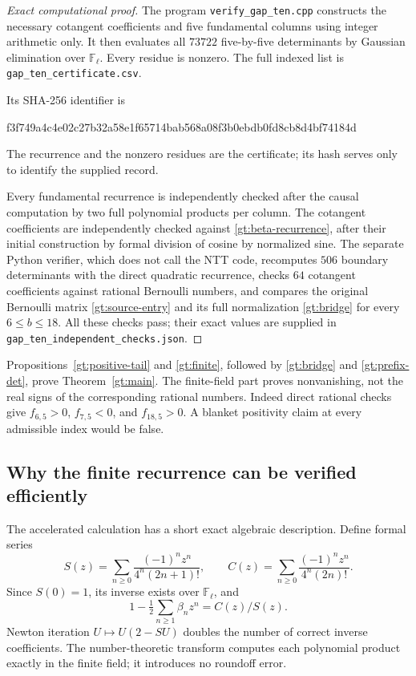 \documentclass[11pt,a4paper]{article}
\theoremstyle{definition}
\theoremstyle{remark}
\numberwithin{equation}{section}
\begin{document}
\begin{proof}[Exact computational proof]
The program \texttt{verify\_gap\_ten.cpp} constructs the necessary
cotangent coefficients and five fundamental columns using integer
arithmetic only. It then evaluates all $73722$ five-by-five
determinants by Gaussian elimination over $\mathbb F_\ell$.
Every residue is nonzero. The full indexed list is
\texttt{gap\_ten\_certificate.csv}.
\begin{samepage}
\noindent Its SHA-256 identifier is
\begin{center}\small\ttfamily
f3f749a4c4e02c27b32a58e1f65714bab568a08f3b0ebdb0fd8cb8d4bf74184d
\end{center}
\end{samepage}
The recurrence and the nonzero residues are the certificate; its
hash serves only to identify the supplied record.

Every fundamental recurrence is independently checked after the
causal computation by two full polynomial products per column.
The cotangent coefficients are independently checked against
\eqref{gt:beta-recurrence}, after their initial construction by
formal division of cosine by normalized sine.
The separate Python verifier, which does not call the NTT code,
recomputes $506$ boundary determinants with the direct quadratic
recurrence, checks $64$ cotangent coefficients against rational
Bernoulli numbers, and compares the original Bernoulli matrix
\eqref{gt:source-entry} and its full normalization
\eqref{gt:bridge} for every $6\le b\le18$.
All these checks pass; their exact values are supplied in
\texttt{gap\_ten\_independent\_checks.json}.
\end{proof}

Propositions~\ref{gt:positive-tail} and \ref{gt:finite}, followed
by \eqref{gt:bridge} and \eqref{gt:prefix-det}, prove
Theorem~\ref{gt:main}. The finite-field part proves nonvanishing,
not the real signs of the corresponding rational numbers.
Indeed direct rational checks give $f_{6,5}>0$, $f_{7,5}<0$,
and $f_{18,5}>0$. A blanket positivity claim at every admissible
index would be false.

\subsection{Why the finite recurrence can be verified efficiently}
\label{gt:fast}

The accelerated calculation has a short exact algebraic description.
Define formal series
\[
 S(z)=\sum_{n\ge0}\frac{(-1)^n z^n}{4^n(2n+1)!},\qquad
 C(z)=\sum_{n\ge0}\frac{(-1)^n z^n}{4^n(2n)!}.
\]
Since $S(0)=1$, its inverse exists over $\mathbb F_\ell$, and
\[
             1-\tfrac12\sum_{n\ge1}\beta_nz^n=C(z)/S(z).
\]
Newton iteration $U\mapsto U(2-SU)$ doubles the number of correct
inverse coefficients. The number-theoretic transform computes each
polynomial product exactly in the finite field; it introduces no
roundoff error.
\end{document}
